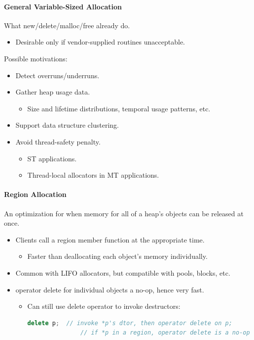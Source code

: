 \paragraph{General Variable-Sized Allocation}
What new/delete/malloc/free already do.
\begin{itemize}
  \item Desirable only if vendor-supplied routines unacceptable.
\end{itemize}
Possible motivations:
\begin{itemize}
  \item Detect overruns/underruns.
  \item Gather heap usage data.
  \begin{itemize}
    \item Size and lifetime distributions, temporal usage patterns, etc.
  \end{itemize}
  \item Support data structure clustering.
  \item Avoid thread-safety penalty.
  \begin{itemize}
    \item ST applications.
    \item Thread-local allocators in MT applications.
  \end{itemize}
\end{itemize}

\paragraph{Region Allocation}
An optimization for when memory for all of a heap's objects can be released at once.
\begin{itemize}
  \item Clients call a region member function at the appropriate time.
  \begin{itemize}
    \item Faster than deallocating each object's memory individually.
  \end{itemize}
  \item Common with LIFO allocators, but compatible with pools, blocks, etc.
  \item operator delete for individual objects a no-op, hence very fast.
  \begin{itemize}
    \item Can still use delete operator to invoke destructors:\\
    \begin{lstlisting}[language=C++]
    delete p;  // invoke *p's dtor, then operator delete on p;
               // if *p in a region, operator delete is a no-op
    \end{lstlisting}
  \end{itemize}
\end{itemize}

